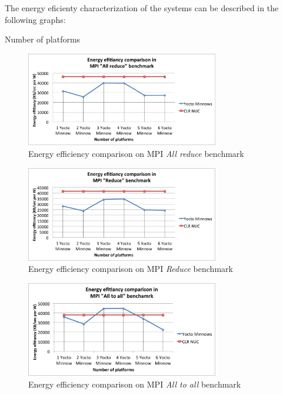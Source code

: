 The energy eficienty characterization of the systems can be described in the
following graphs: 

Number of platforms

\begin{figure}[H]
\centering
\includegraphics[width=0.75\textwidth]{images/energy_results/allreduce.png}
\caption{Energy efficiency comparison on MPI \textit{All reduce} benchmark}
\label{all_reduce_energy}
\end{figure}


\begin{figure}[H]
\centering
\includegraphics[width=0.75\textwidth]{images/energy_results/reduce.png}
\caption{Energy efficiency comparison on MPI \textit{Reduce} benchmark}
\label{reduce_energy}
\end{figure}


\begin{figure}[H]
\centering
\includegraphics[width=0.75\textwidth]{images/energy_results/all_to_all.png}
\caption{Energy efficiency comparison on MPI \textit{All to all} benchmark}
\label{alltoall_energy}
\end{figure}


